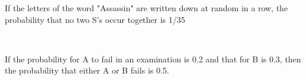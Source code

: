 \iffalse
  \title{PROBABILITY}
  \author{J.KEDARANANDA}
  \section{true-false}
\fi
    \item If the letters of the word "Assassin" are written down at random in a row, the probability that no two S's occur together is 1/35
    
    \hfill{}\\
    \item If the probability for A to fail in an examination is 0.2 and that for B is 0.3, then the probability that either A or B fails is 0.5.
    
    \hfill{}
